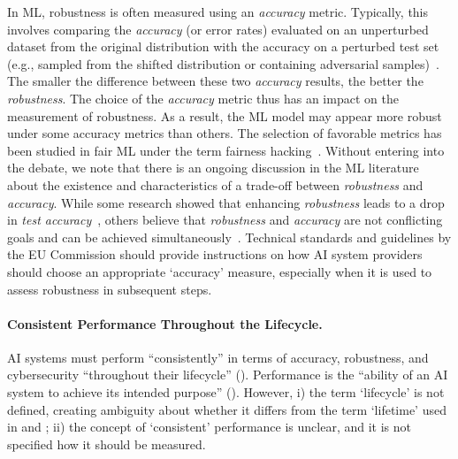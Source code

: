 In ML, robustness is often measured using an \emph{accuracy} metric.
%
Typically, this involves comparing the \emph{accuracy} (or error rates) evaluated on an unperturbed dataset from the original distribution with the accuracy on a perturbed test set (e.g., sampled from the shifted distribution or containing adversarial samples)~\cite{taori2020measuring, hendrycks2021many, goodfellow2014explaining}. 
%
The smaller the difference between these two \emph{accuracy} results, the better the \emph{robustness}.
%
The choice of the \emph{accuracy} metric thus has an impact on the measurement of robustness. 
%
As a result, the ML model may appear more robust under some accuracy metrics than others.
% 
The selection of favorable metrics has been studied in fair ML under the term fairness hacking~\cite{meding2024fairness, simson2024one, black2024d}.
%
Without entering into the debate, we note that there is an ongoing discussion in the ML literature about the existence and characteristics of a trade-off between \emph{robustness} and \emph{accuracy}. 
%
While some research showed that enhancing \emph{robustness} leads to a drop in \emph{test accuracy}~\cite{zhang2019theoretically, rade2022reducing, tsipras2018robustness}, others believe that \emph{robustness} and \emph{accuracy} are not conflicting goals and can be achieved simultaneously~\cite{yang2020closer, raghunathan2020understanding}.
%
Technical standards and guidelines by the EU Commission should provide instructions on how AI system providers should choose an appropriate `accuracy' measure, especially when it is used to assess robustness in subsequent steps.


\paragraph{Consistent Performance Throughout the Lifecycle.}
AI systems must perform ``consistently'' in terms of accuracy, robustness, and cybersecurity ``throughout their lifecycle'' (). 
%
Performance is the ``ability of an AI system to achieve its intended purpose'' ().
%
However, i) the term `lifecycle' is not defined, creating ambiguity about whether it differs from the term `lifetime' used in  and ; ii) the concept of `consistent' performance is unclear, and it is not specified how it should be measured.
% 

